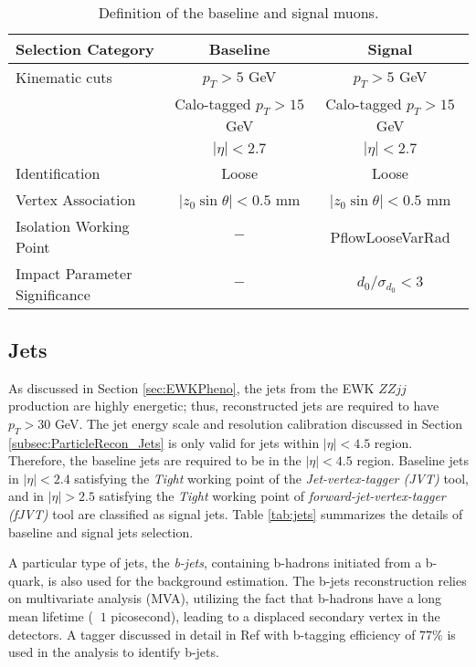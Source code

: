 \begin{table}[ht]
    \centering
        \caption{Definition of the baseline and signal muons.\label{tab:muon_baseline_signal}}
        \begin{tabular}{|| l || c | c ||}
        \hline
        Selection Category & \textbf{Baseline} & \textbf{Signal} \\
        \hline\hline
        Kinematic cuts & $p_{T} > 5$ GeV & $p_{T} > 5$ GeV \\
                    & Calo-tagged $ p_{T} > 15$ GeV & Calo-tagged $ p_{T} > 15$ GeV \\
              & $|\eta| < 2.7$ & $|\eta| < 2.7$\\
        \hline
        Identification & Loose & Loose \\
        \hline 
        Vertex Association & $|z_{0}\sin\theta| < 0.5$ mm & $|z_{0}\sin\theta|< 0.5$ mm\\
        \hline
        Isolation Working Point & $-$ & PflowLooseVarRad\\
        \hline 
        Impact Parameter Significance & $-$ & $d_{0}/\sigma_{d_{0}} < 3$ \\
        \hline
    \end{tabular}
\end{table}

\subsection{Jets}
\label{subsec:JetRecon} 
As discussed in Section \ref{sec:EWKPheno}, the jets from the EWK $ZZjj$ production are highly energetic; thus, reconstructed jets are required to have $p_{T} > 30$ GeV. The jet energy scale and resolution calibration discussed in Section \ref{subsec:ParticleRecon_Jets} is only valid for jets within $ |\eta| < 4.5 $ region. Therefore, the baseline jets are required to be in the $ |\eta| < 4.5 $ region. Baseline jets in $ |\eta| < 2.4 $ satisfying the \textit{Tight} working point of the \textit{Jet-vertex-tagger (JVT)} tool, and in $ |\eta| > 2.5 $ satisfying the \textit{Tight} working point of \textit{forward-jet-vertex-tagger (fJVT)} tool are classified as signal jets. Table \ref{tab:jets} summarizes the details of baseline and signal jets selection. 

A particular type of jets, the \textit{b-jets}, containing b-hadrons initiated from a b-quark, is also used for the background estimation. The b-jets reconstruction relies on multivariate analysis (MVA), utilizing the fact that b-hadrons have a long mean lifetime ( $~1$ picosecond), leading to a displaced secondary vertex in the detectors. A tagger discussed in detail in Ref \cite{bTagging} with b-tagging efficiency of $77\%$ is used in the analysis to identify b-jets.

